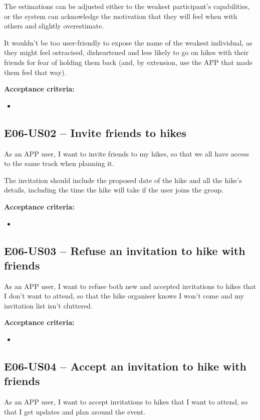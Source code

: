 The estimations can be adjusted either to the weakest participant's capabilities, or the system can acknowledge the motivation that they will feel when with others and slightly overestimate.

It wouldn't be too user-friendly to expose the name of the weakest individual, as they might feel ostracised, disheartened and less likely to go on hikes with their friends for fear of holding them back (and, by extension, use the APP that made them feel that way).

\textbf{Acceptance criteria:}
\begin{itemize}
    \item 
\end{itemize}


\subsection*{E06-US02 -- Invite friends to hikes}
As an APP user, I want to invite friends to my hikes, so that we all have access to the same track when planning it.

The invitation should include the proposed date of the hike and all the hike's details, including the time the hike will take if the user joins the group.

\textbf{Acceptance criteria:}
\begin{itemize}
    \item 
\end{itemize}

\subsection*{E06-US03 -- Refuse an invitation to hike with friends}
As an APP user, I want to refuse both new and accepted invitations to hikes that I don't want to attend, so that the hike organiser knows I won't come and my invitation list isn't cluttered.

\textbf{Acceptance criteria:}
\begin{itemize}
    \item 
\end{itemize}

\subsection*{E06-US04 -- Accept an invitation to hike with friends}
As an APP user, I want to accept invitations to hikes that I want to attend, so that I get updates and plan around the event.

